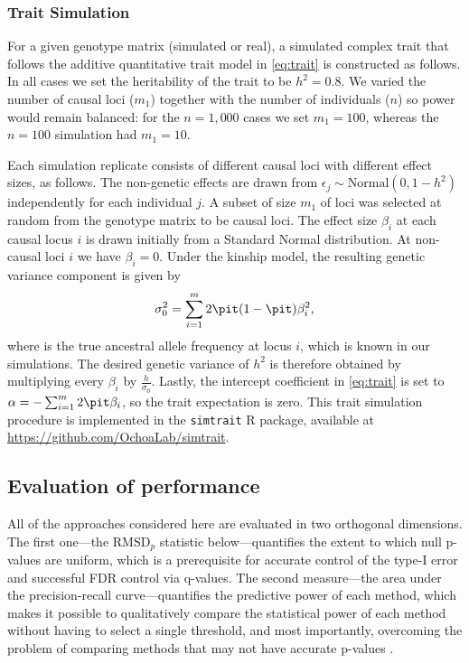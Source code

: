 \documentclass[11pt]{article}
\newcommand{\rmsd}{\text{RMSD}_p}
\begin{document}
\subsubsection{Trait Simulation}

For a given genotype matrix (simulated or real), a simulated complex trait that follows the additive quantitative trait model in \cref{eq:trait} is constructed as follows.
In all cases we set the heritability of the trait to be $h^2 = 0.8$.
We varied the number of causal loci ($m_1$) together with the number of individuals ($n$) so power would remain balanced:
for the $n = 1,000$ cases we set $m_1 = 100$, whereas the $n = 100$ simulation had $m_1 = 10$.

Each simulation replicate consists of different causal loci with different effect sizes, as follows.
The non-genetic effects are drawn from $\epsilon_j \sim \text{Normal}(0, 1 - h^2 )$ independently for each individual $j$.
A subset of size $m_1$ of loci was selected at random from the genotype matrix to be causal loci.
The effect size $\beta_i$ at each causal locus $i$ is drawn initially from a Standard Normal distribution.
At non-causal loci $i$ we have $\beta_i = 0$.
Under the kinship model, the resulting genetic variance component is given by
$$
\sigma^2_0
=
\sum_{i = 1}^m 2 \pit ( 1 - \pit ) \beta_i^2 ,
$$
where \pit is the true ancestral allele frequency at locus $i$, which is known in our simulations.
The desired genetic variance of $h^2$ is therefore obtained by multiplying every $\beta_i$ by $\frac{h}{ \sigma_0 }$.
Lastly, the intercept coefficient in \cref{eq:trait} is set to $\alpha = - \sum_{i=1}^m 2 \pit \beta_i$, so the trait expectation is zero.
This trait simulation procedure is implemented in the \texttt{simtrait} R package, available at
\url{https://github.com/OchoaLab/simtrait}.

\subsection{Evaluation of performance}

All of the approaches considered here are evaluated in two orthogonal dimensions.
The first one---the $\rmsd$ statistic below---quantifies the extent to which null p-values are uniform, which is a prerequisite for accurate control of the type-I error and successful FDR control via q-values.
The second measure---the area under the precision-recall curve---quantifies the predictive power of each method, which makes it possible to qualitatively compare the statistical power of each method without having to select a single threshold, and most importantly, overcoming the problem of comparing methods that may not have accurate p-values \citep{bouaziz_accounting_2011}.
\end{document}
